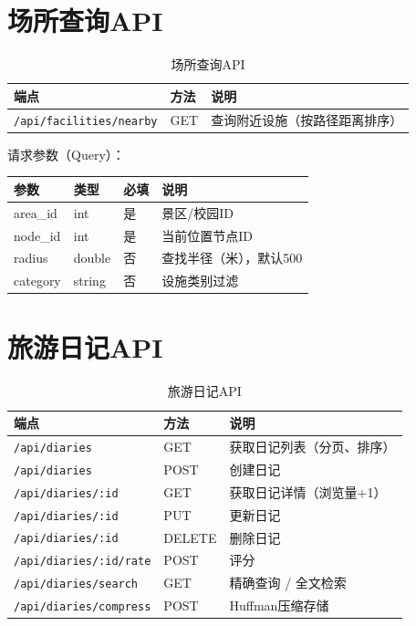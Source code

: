 \documentclass[12pt,a4paper]{report}
\begin{document}
\section{场所查询API}

\begin{table}[H]
\centering
\caption{场所查询API}
\small
\begin{tabularx}{\textwidth}{l l X}
\toprule
\textbf{端点} & \textbf{方法} & \textbf{说明} \\
\midrule
\texttt{/api/facilities/nearby} & GET & 查询附近设施（按路径距离排序） \\
\bottomrule
\end{tabularx}
\end{table}

请求参数（Query）：
\begin{table}[H]
\centering
\small
\begin{tabular}{llll}
\toprule
\textbf{参数} & \textbf{类型} & \textbf{必填} & \textbf{说明} \\
\midrule
area\_id & int & 是 & 景区/校园ID \\
node\_id & int & 是 & 当前位置节点ID \\
radius & double & 否 & 查找半径（米），默认500 \\
category & string & 否 & 设施类别过滤 \\
\bottomrule
\end{tabular}
\end{table}

\section{旅游日记API}

\begin{table}[H]
\centering
\caption{旅游日记API}
\small
\begin{tabularx}{\textwidth}{l l X}
\toprule
\textbf{端点} & \textbf{方法} & \textbf{说明} \\
\midrule
\texttt{/api/diaries} & GET & 获取日记列表（分页、排序） \\
\texttt{/api/diaries} & POST & 创建日记 \\
\texttt{/api/diaries/:id} & GET & 获取日记详情（浏览量+1） \\
\texttt{/api/diaries/:id} & PUT & 更新日记 \\
\texttt{/api/diaries/:id} & DELETE & 删除日记 \\
\texttt{/api/diaries/:id/rate} & POST & 评分 \\
\texttt{/api/diaries/search} & GET & 精确查询 / 全文检索 \\
\texttt{/api/diaries/compress} & POST & Huffman压缩存储 \\
\bottomrule
\end{tabularx}
\end{table}
\end{document}
